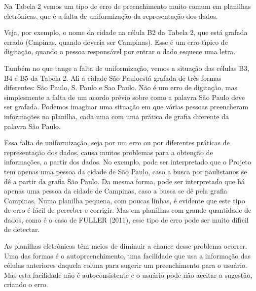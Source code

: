 \documentclass[
12pt,		%
openright,	%
twoside,  %
a4paper,			%
chapter=TITLE,		%
english,			%
french,				%
spanish,			%
brazil				%
]{USPSC-classe/USPSC}
\begin{document}
Na Tabela 2 vemos um tipo de erro de preenchimento muito comum em planilhas eletr\^onicas, que \'e a falta de uniformiza\c{c}\~ao da representa\c{c}\~ao dos dados.








Veja, por exemplo, o nome da cidade na c\'elula B2 da Tabela 2, que est\'a grafada errado (Cmpinas, quando deveria ser Campinas). Esse \'e um erro t\'{\i}pico de digita\c{c}\~ao, quando a pessoa respons\'avel por entrar o dado esquece uma letra.








Tamb\'em no que tange a falta de uniformiza\c{c}\~ao, vemos a situa\c{c}\~ao das c\'elulas B3, B4 e B5 da Tabela 2. Ali a cidade \textquotedbl S\~ao Paulo\textquotedbl  est\'a grafada de tr\^es formas diferentes: S\~ao Paulo, S. Paulo e Sao Paulo. N\~ao \'e um erro de digita\c{c}\~ao, mas simplesmente a falta de um acordo pr\'evio sobre como a palavra S\~ao Paulo deve ser grafada. Podemos imaginar uma situa\c{c}\~ao em que v\'arias pessoas preencheram informa\c{c}\~oes na planilha, cada uma com uma pr\'atica de grafia diferente da palavra S\~ao Paulo.








Essa falta de uniformiza\c{c}\~ao, seja por um erro ou por diferentes pr\'aticas de representa\c{c}\~ao dos dados, causa muitos problemas para a obten\c{c}\~ao de informa\c{c}\~oes, a partir dos dados. No exemplo, pode ser interpretado que o Projeto tem apenas uma pessoa da cidade de S\~ao Paulo, caso a busca por paulistanos se d\^e a partir da grafia \textquotedbl S\~ao Paulo\textquotedbl . Da mesma forma, pode ser interpretado que h\'a apenas uma pessoa da cidade de Campinas, caso a busca se d\^e pela grafia \textquotedbl Campinas\textquotedbl . Numa planilha pequena, com poucas linhas, \'e evidente que este tipo de erro \'e f\'acil de perceber e corrigir. Mas em planilhas com grande quantidade de dados, como \'e o caso de  FULLER (2011), esse tipo de erro pode ser muito dif\'{\i}cil de detectar.








As planilhas eletr\^onicas t\^em meios de diminuir a chance desse problema ocorrer. Uma das formas \'e o autopreenchimento, uma facilidade que usa a informa\c{c}\~ao das c\'elulas anteriores daquela coluna para sugerir um preenchimento para o usu\'ario. Mas esta facilidade n\~ao \'e autoconsistente e o usu\'ario pode n\~ao aceitar a sugest\~ao, criando o erro.
\end{document}
